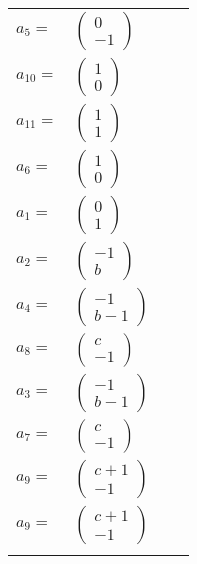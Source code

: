 \documentclass[1p]{elsarticle_modified}
\theoremstyle{definition}
\begin{document}
\begin{tabular}{m{7pt} m{180pt} m{7pt} m{180pt} }
\flushright $a_{5}=$&$\begin{pmatrix}0\\-1\end{pmatrix}$ \\
\flushright $a_{10}=$&$\begin{pmatrix}1\\0\end{pmatrix}$ \\
\flushright $a_{11}=$&$\begin{pmatrix}1\\1\end{pmatrix}$ \\
\flushright $a_{6}=$&$\begin{pmatrix}1\\0\end{pmatrix}$ \\
\flushright $a_{1}=$&$\begin{pmatrix}0\\1\end{pmatrix}$ \\
\flushright $a_{2}=$&$\begin{pmatrix}-1\\b\end{pmatrix}$ \\
\flushright $a_{4}=$&$\begin{pmatrix}-1\\b-1\end{pmatrix}$ \\
\flushright $a_{8}=$&$\begin{pmatrix}c\\-1\end{pmatrix}$ \\
\flushright $a_{3}=$&$\begin{pmatrix}-1\\b-1\end{pmatrix}$ \\
\flushright $a_{7}=$&$\begin{pmatrix}c\\-1\end{pmatrix}$ \\
\flushright $a_{9}=$&$\begin{pmatrix}c+1\\-1\end{pmatrix}$\\ \flushright $a_{9}=$&$\begin{pmatrix}c+1\\-1\end{pmatrix}$\\&\end{tabular}
\end{document}
